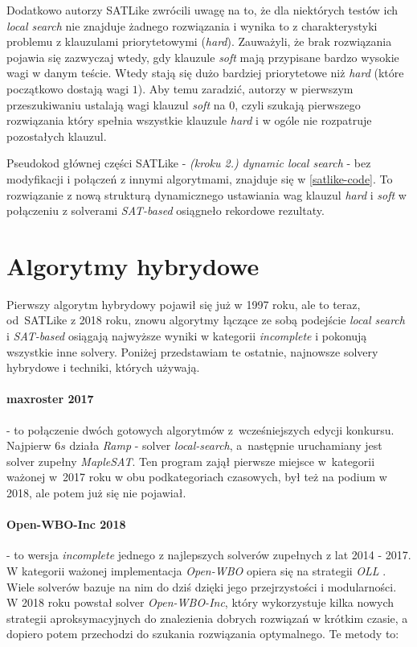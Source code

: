 \documentclass[shortabstract]{iithesis}
\begin{document}
Dodatkowo autorzy SATLike zwrócili uwagę na to, że dla niektórych testów ich \textit{local search} nie znajduje żadnego rozwiązania i wynika to z charakterystyki problemu z klauzulami priorytetowymi (\textit{hard}). Zauważyli, że brak rozwiązania pojawia się zazwyczaj wtedy, gdy klauzule \textit{soft} mają przypisane bardzo wysokie wagi w danym teście. Wtedy stają się dużo bardziej priorytetowe niż \textit{hard} (które początkowo dostają wagi $1$). Aby temu zaradzić, autorzy w pierwszym przeszukiwaniu ustalają wagi klauzul \textit{soft} na $0$, czyli szukają pierwszego rozwiązania który spełnia wszystkie klauzule \textit{hard} i w ogóle nie rozpatruje pozostałych klauzul.

Pseudokod głównej części SATLike - \textit{(kroku 2.) dynamic local search} - bez modyfikacji i połączeń z innymi algorytmami, znajduje się w \ref{satlike-code}. To rozwiązanie z nową strukturą dynamicznego ustawiania wag klauzul \textit{hard} i \textit{soft} w połączeniu z solverami \textit{SAT-based} osiągneło rekordowe rezultaty.

\section{Algorytmy hybrydowe}
Pierwszy algorytm hybrydowy pojawił się już w 1997 roku, ale to teraz, od~SATLike z 2018 roku, znowu algorytmy łączące ze sobą podejście \textit{local search} i \textit{SAT-based} osiągają najwyższe wyniki w kategorii \textit{incomplete} i pokonują wszystkie inne solvery. Poniżej przedstawiam te ostatnie, najnowsze solvery hybrydowe i techniki, których używają.

\paragraph{maxroster 2017 \cite{maxroster}} - to połączenie dwóch gotowych algorytmów z~wcześniejszych edycji konkursu. Najpierw $6s$ działa \textit{Ramp} - solver \textit{local-search}, a~następnie uruchamiany jest solver zupełny \textit{MapleSAT}. Ten program zajął pierwsze miejsce w~kategorii ważonej w~2017 roku w obu podkategoriach czasowych, był też na podium w 2018, ale potem już się nie pojawiał.

\paragraph{Open-WBO-Inc 2018 \cite{openwbo}} - to wersja \textit{incomplete} jednego z najlepszych solverów zupełnych z lat 2014 - 2017. W kategorii ważonej implementacja \textit{Open-WBO} opiera się na 
strategii \textit{OLL} \cite{oll}. Wiele solverów bazuje na nim do dziś dzięki jego przejrzystości i modularności.\\
W 2018 roku powstał solver \textit{Open-WBO-Inc}, który wykorzystuje kilka nowych strategii aproksymacyjnych do znalezienia dobrych rozwiązań w krótkim czasie, a dopiero potem przechodzi do szukania rozwiązania optymalnego. Te metody to:
\end{document}
